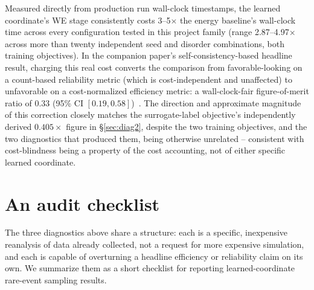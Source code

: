 \documentclass[a4paper,fleqn]{cas-sc}
\begin{document}
Measured directly from production run wall-clock timestamps, the learned
coordinate's WE stage consistently costs 3--5$\times$ the energy baseline's
wall-clock time across every configuration tested in this project family
(range 2.87--4.97$\times$ across more than twenty independent seed and
disorder combinations, both training objectives). In the companion
paper's self-consistency-based headline result, charging this real cost
converts the comparison from favorable-looking on a count-based reliability
metric (which is cost-independent and unaffected) to unfavorable on a
cost-normalized efficiency metric: a wall-clock-fair figure-of-merit ratio
of $0.33$ (95\% CI $[0.19,0.58]$)~\citep{alzaatreh2026}. The direction and
approximate magnitude of this correction closely matches the surrogate-label
objective's independently derived $0.405\times$ figure in
\S\ref{sec:diag2}, despite the two training objectives, and the two
diagnostics that produced them, being otherwise unrelated -- consistent
with cost-blindness being a property of the cost accounting, not of either
specific learned coordinate.

\section{An audit checklist}\label{sec:checklist}

The three diagnostics above share a structure: each is a specific,
inexpensive reanalysis of data already collected, not a request for more
expensive simulation, and each is capable of overturning a headline
efficiency or reliability claim on its own. We summarize them as a short
checklist for reporting learned-coordinate rare-event sampling results.
\end{document}
